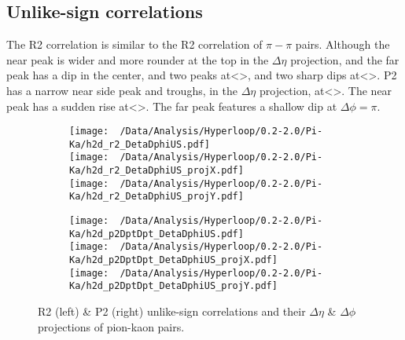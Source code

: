 \documentclass[12pt,a4paper,twoside]{report}
\begin{document}
\subsection{Unlike-sign correlations}
The R2 correlation is similar to the R2 correlation of $\pi-\pi$ pairs. Although the near peak is wider and more rounder at the top in the $\Delta\eta$ projection, and the far peak has a dip in the center, and two peaks at<>, and two sharp dips at<>. P2 has a narrow near side peak and troughs, in the $\Delta\eta$ projection, at<>. The near peak has a sudden rise at<>. The far peak features a shallow dip at $\Delta\phi=\pi$.
\begin{figure}[H]
	\begin{subfigure}{0.49\linewidth}
		\texttt{[image: ~/Data/Analysis/Hyperloop/0.2-2.0/Pi-Ka/h2d\_r2\_DetaDphiUS.pdf]}\\
		\texttt{[image: ~/Data/Analysis/Hyperloop/0.2-2.0/Pi-Ka/h2d\_r2\_DetaDphiUS\_projX.pdf]}\\
		\texttt{[image: ~/Data/Analysis/Hyperloop/0.2-2.0/Pi-Ka/h2d\_r2\_DetaDphiUS\_projY.pdf]}\\
	\end{subfigure}
	\begin{subfigure}{0.49\linewidth}
		\texttt{[image: ~/Data/Analysis/Hyperloop/0.2-2.0/Pi-Ka/h2d\_p2DptDpt\_DetaDphiUS.pdf]}\\
		\texttt{[image: ~/Data/Analysis/Hyperloop/0.2-2.0/Pi-Ka/h2d\_p2DptDpt\_DetaDphiUS\_projX.pdf]}\\
		\texttt{[image: ~/Data/Analysis/Hyperloop/0.2-2.0/Pi-Ka/h2d\_p2DptDpt\_DetaDphiUS\_projY.pdf]}\\
	\end{subfigure}
	\caption{R2 (left) \& P2 (right) unlike-sign correlations and their $\Delta\eta$ \& $\Delta\phi$ projections of pion-kaon pairs.}
\end{figure}
\end{document}
